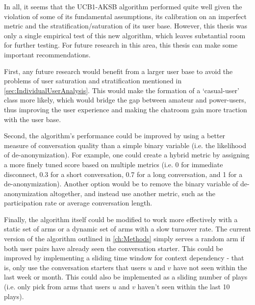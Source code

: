 In all, it seems that the UCB1-AKSB algorithm performed quite well given the violation of some of its fundamental assumptions, its calibration on an imperfect metric and the stratification/saturation of its user base. However, this thesis was only a single empirical test of this new algorithm, which leaves substantial room for further testing. For future research in this area, this thesis can make some important recommendations.

First, any future research would benefit from a larger user base to avoid the problems of user saturation and stratification mentioned in \autoref{sec:IndividualUserAnalysis}. This would make the formation of a `casual-user' class more likely, which would bridge the gap between amateur and power-users, thus improving the user experience and making the chatroom gain more traction with the user base.

Second, the algorithm's performance could be improved by using a better measure of conversation quality than a simple binary variable (i.e. the likelihood of de-anonymization). For example, one could create a hybrid metric by assigning a more finely tuned score based on multiple metrics (i.e. 0 for immediate disconnect, 0.3 for a short conversation, 0.7 for a long conversation, and 1 for a de-anonymization). Another option would be to remove the binary variable of de-anonymization altogether, and instead use another metric, such as the participation rate or average conversation length. 

Finally, the algorithm itself could be modified to work more effectively with a static set of arms or a dynamic set of arms with a slow turnover rate. The current version of the algorithm outlined in \autoref{ch:Methods} simply serves a random arm if both user pairs have already seen the conversation starter. This could be improved by implementing a sliding time window for context dependency - that is, only use the conversation starters that users $u$ and $v$ have not seen within the last week or month. This could also be implemented as a sliding number of plays (i.e. only pick from arms that users $u$ and $v$ haven't seen within the last 10 plays).

